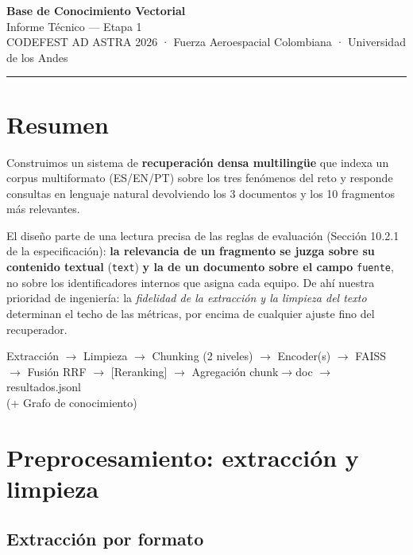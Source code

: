 \documentclass[10pt,a4paper]{article}
\begin{document}
\begin{center}
{\LARGE\bfseries\color{azul} Base de Conocimiento Vectorial}\\[0.3ex]
{\large Informe Técnico — Etapa 1}\\[0.5ex]
{\footnotesize\color{gris} CODEFEST AD ASTRA 2026 · Fuerza Aeroespacial Colombiana · Universidad de los Andes}
\end{center}
\vspace{0.4ex}
\hrule
\vspace{1ex}

\section{Resumen}

Construimos un sistema de \textbf{recuperación densa multilingüe} que indexa un corpus multiformato
(ES/EN/PT) sobre los tres fenómenos del reto y responde consultas en lenguaje natural devolviendo
los 3 documentos y los 10 fragmentos más relevantes.

El diseño parte de una lectura precisa de las reglas de evaluación (Sección 10.2.1 de la
especificación): \textbf{la relevancia de un fragmento se juzga sobre su contenido textual}
(\texttt{text}) \textbf{y la de un documento sobre el campo} \texttt{fuente}, no sobre los
identificadores internos que asigna cada equipo. De ahí nuestra prioridad de ingeniería: la
\emph{fidelidad de la extracción y la limpieza del texto} determinan el techo de las métricas,
por encima de cualquier ajuste fino del recuperador.

\begin{center}\small\ttfamily
Extracción $\rightarrow$ Limpieza $\rightarrow$ Chunking (2 niveles) $\rightarrow$ Encoder(s) $\rightarrow$ FAISS\\
$\rightarrow$ Fusión RRF $\rightarrow$ [Reranking] $\rightarrow$ Agregación chunk$\rightarrow$doc $\rightarrow$ resultados.jsonl\\
(+ Grafo de conocimiento)
\end{center}

\section{Preprocesamiento: extracción y limpieza}

\subsection{Extracción por formato}
\end{document}
